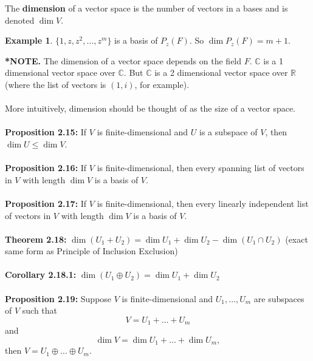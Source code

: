 \documentclass{article}
\DeclareMathOperator{\Dim}{dim}
\theoremstyle{definition}
\newtheorem{ex}{Example}[section]
\begin{document}
\noindent The \textbf{dimension} of a vector space is the number of vectors in a bases and is denoted $\Dim V$.
\begin{ex}
$\{1, z, z^2, \dots, z^m\}$ is a basis of $P_z(F)$. So $\Dim P_z(F) = m + 1$.
\end{ex}
\noindent \textbf{*NOTE.} The dimension of a vector space depends on the field $F$. $\mathbb{C}$ is a 1 dimensional vector space over $\mathbb{C}$. But $\mathbb{C}$ is a 2 dimensional vector space over $\mathbb{R}$ (where the list of vectors is $(1, i)$, for example). \\ \\
More intuitively, dimension should be thought of as the size of a vector space. \\ \\
\textbf{Proposition 2.15:} If $V$ is finite-dimensional and $U$ is a subspace of $V$, then $\Dim U \leq \Dim V$. \\ \\
\textbf{Proposition 2.16:} If $V$ is finite-dimensional, then every spanning list of vectors in $V$ with length $\Dim V$ is a basis of $V$. \\ \\
\textbf{Proposition 2.17:} If $V$ is finite-dimensional, then every linearly independent list of vectors in $V$ with length $\Dim V$ is a basis of $V$. \\ \\
\textbf{Theorem 2.18:} $\Dim(U_1 + U_2) = \Dim U_1 + \Dim U_2 - \Dim(U_1 \cap U_2)$ (exact same form as Principle of Inclusion Exclusion)\\ \\
\textbf{Corollary 2.18.1:} $\Dim(U_1 \oplus U_2) = \Dim U_1 + \Dim U_2$ \\ \\
\textbf{Proposition 2.19:} Suppose $V$ is finite-dimensional and $U_1, \dots, U_m$ are subspaces of $V$ such that $$V = U_1 + \dots + U_m$$ and $$\Dim V =\Dim U_1 + \dots + \Dim U_m,$$ then $V = U_1 \oplus \dots \oplus U_m.$
\end{document}

